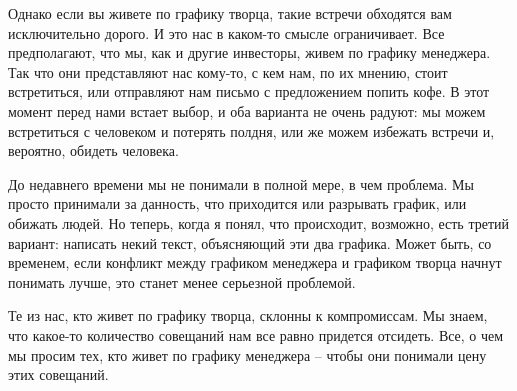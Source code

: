 \documentclass[ebook,12pt,oneside,openany]{memoir}
\begin{document}
Однако если вы живете по графику творца, такие встречи обходятся вам
исключительно дорого. И это нас в каком-то смысле ограничивает. Все
предполагают, что мы, как и другие инвесторы, живем по графику
менеджера. Так что они представляют нас кому-то, с кем нам, по их
мнению, стоит встретиться, или отправляют нам письмо с предложением
попить кофе. В этот момент перед нами встает выбор, и оба варианта не
очень радуют: мы можем встретиться с человеком и потерять полдня, или
же можем избежать встречи и, вероятно, обидеть человека.

До недавнего времени мы не понимали в полной мере, в чем проблема. Мы
просто принимали за данность, что приходится или разрывать график, или
обижать людей. Но теперь, когда я понял, что происходит, возможно,
есть третий вариант: написать некий текст, объясняющий эти два
графика. Может быть, со временем, если конфликт между графиком
менеджера и графиком творца начнут понимать лучше, это станет менее
серьезной проблемой.

Те из нас, кто живет по графику творца, склонны к компромиссам. Мы
знаем, что какое-то количество совещаний нам все равно придется
отсидеть. Все, о чем мы просим тех, кто живет по графику менеджера –
чтобы они понимали цену этих совещаний.
\end{document}
